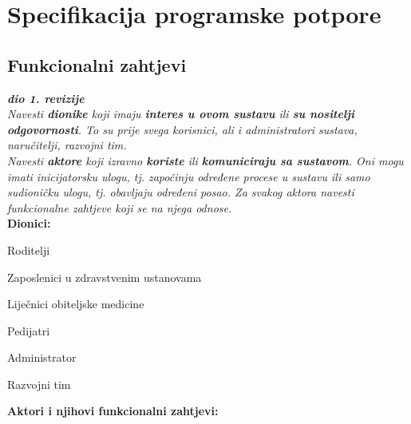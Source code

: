 \chapter{Specifikacija programske potpore}
		
	\section{Funkcionalni zahtjevi}
			
			\textbf{\textit{dio 1. revizije}}\\
			
			\textit{Navesti \textbf{dionike} koji imaju \textbf{interes u ovom sustavu} ili  \textbf{su nositelji odgovornosti}. To su prije svega korisnici, ali i administratori sustava, naručitelji, razvojni tim.}\\
				
			\textit{Navesti \textbf{aktore} koji izravno \textbf{koriste} ili \textbf{komuniciraju sa sustavom}. Oni mogu imati inicijatorsku ulogu, tj. započinju određene procese u sustavu ili samo sudioničku ulogu, tj. obavljaju određeni posao. Za svakog aktora navesti funkcionalne zahtjeve koji se na njega odnose.}\\
			
			
			\noindent \textbf{Dionici:}
			
			\begin{packed_enum}
				
				\item Roditelji
				\item Zaposlenici u zdravstvenim ustanovama
					\begin{packed_enum}
						\item Liječnici obiteljske medicine
						\item Pedijatri
					\end{packed_enum}				
				\item Administrator
				\item Razvojni tim
				
			\end{packed_enum}
			
			\noindent \textbf{Aktori i njihovi funkcionalni zahtjevi:}
			
